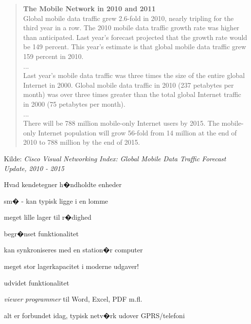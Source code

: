 \documentclass[20pt,landscape,a4paper,footrule]{foils}
\begin{document}
\begin{quote}
{\bf The Mobile Network in 2010 and 2011}\\
Global mobile data traffic grew 2.6-fold in 2010, nearly tripling for the third year in a row. The 2010 mobile data traffic growth rate was higher than anticipated. Last year's forecast projected that the growth rate would be 149 percent. This year's estimate is that global mobile data traffic grew 159 percent in 2010.\\
...\\
Last year's mobile data traffic was three times the size of the entire global Internet in 2000. Global mobile data traffic in 2010 (237 petabytes per month) was over three times greater than the total global Internet traffic in 2000 (75 petabytes per month).\\
...\\
There will be 788 million mobile-only Internet users by 2015. The mobile-only Internet population will grow 56-fold from 14 million at the end of 2010 to 788 million by the end of 2015.
\end{quote}

{\small Kilde:
\emph{Cisco Visual Networking Index: Global Mobile Data Traffic Forecast Update, 2010 - 2015}}




\begin{list1}
\item Hvad kendetegner h�ndholdte enheder
\begin{list2}
\item sm� - kan typisk ligge i en lomme
\item meget lille lager til r�dighed
\item begr�nset funktionalitet
\item kan synkroniseres med en station�r computer
\pause
\item meget stor lagerkapacitet i moderne udgaver!
\item udvidet funktionalitet
\item \emph{viewer programmer} til Word, Excel, PDF m.fl.
\item alt er forbundet idag, typisk netv�rk udover GPRS/telefoni
\end{list2}
\end{list1}

\end{document}
